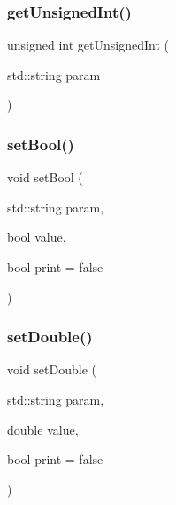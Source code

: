 \mbox{\label{classparameters_class_ac01aa6fa0c3b6914b0e7b75128c99bc3}} 
\subsubsection{\texorpdfstring{get\+Unsigned\+Int()}{getUnsignedInt()}}
{\footnotesize\ttfamily unsigned int get\+Unsigned\+Int (\begin{DoxyParamCaption}\item[{std\+::string}]{param }\end{DoxyParamCaption})}

\mbox{\label{classparameters_class_a182ca3f26a78847edd31e99fe68059da}} 
\subsubsection{\texorpdfstring{set\+Bool()}{setBool()}}
{\footnotesize\ttfamily void set\+Bool (\begin{DoxyParamCaption}\item[{std\+::string}]{param,  }\item[{bool}]{value,  }\item[{bool}]{print = {\ttfamily false} }\end{DoxyParamCaption})}

\mbox{\label{classparameters_class_ab2755d1057bef657585eb7fdb7d4b5c4}} 
\subsubsection{\texorpdfstring{set\+Double()}{setDouble()}}
{\footnotesize\ttfamily void set\+Double (\begin{DoxyParamCaption}\item[{std\+::string}]{param,  }\item[{double}]{value,  }\item[{bool}]{print = {\ttfamily false} }\end{DoxyParamCaption})}

\mbox{\label{classparameters_class_a68203d58af0caf8d232ca9a6fcb0a190}} 
